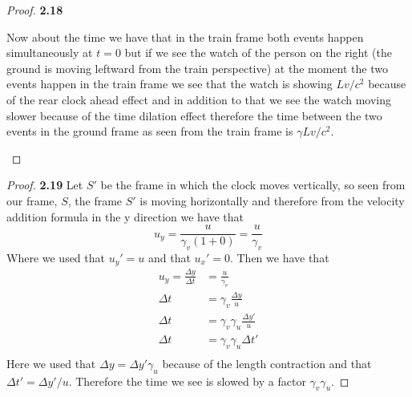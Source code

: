 \documentclass[11pt]{article}
\theoremstyle{definition}
\begin{document}
\begin{proof}{\textbf{2.18}}
\begin{itemize}
            Now about the time we have that in the train frame both events happen
            simultaneously at $t=0$ but if we see the watch of the person on the right
            (the ground is moving leftward from the train perspective)
            at the moment the two events happen in the train frame we see that the watch
            is showing $Lv/c^2$ because of the rear clock ahead effect and in addition
            to that we see the watch moving slower because of the time dilation effect
            therefore the time between the two events in the ground frame as seen
            from the train frame is $\gamma Lv/c^2$.
        \end{itemize}
    \end{proof}
	\begin{proof}{\textbf{2.19}}
        Let $S'$ be the frame in which the clock moves vertically, so seen from our
        frame, $S$, the frame $S'$ is moving horizontally and therefore from the velocity
        addition formula in the y direction we have that
        $$u_y = \frac{u}{\gamma_{v}(1 + 0)} = \frac{u}{\gamma_v}$$
        Where we used that $u_y' = u$ and that $u_x' = 0$. Then we have that
        \begin{align*}
            u_y = \frac{\Delta y}{\Delta t} &= \frac{u}{\gamma_v}\\
            \Delta t &= \gamma_v \frac{\Delta y}{u}\\
            \Delta t &= \gamma_v \gamma_u \frac{\Delta y'}{u}\\
            \Delta t &= \gamma_v \gamma_u \Delta t'\\
        \end{align*}
        Here we used that $\Delta y = \Delta y' \gamma_u$ because of the length
        contraction and that $\Delta t' = \Delta y' / u$. Therefore the time we see
        is slowed by a factor $\gamma_v \gamma_u$.
    \end{proof}
\end{document}
